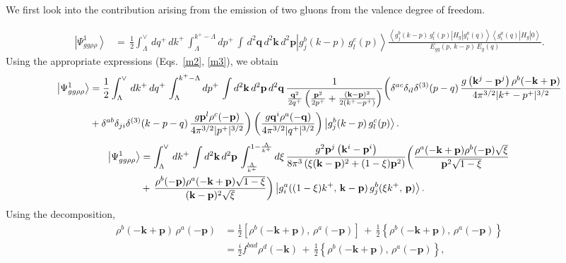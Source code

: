 \documentclass[aps,prd,amsmath,amssymb,nofootinbib]{revtex4-2}
\numberwithin{equation}{section}
\begin{document}
We first look into the contribution arising from the emission of two gluons from the valence degree of freedom.
\begin{figure}[h]
\end{figure}
\begin{align}
\left|\Psi_{gg\rho\rho}^{1}\right\rangle &=\,\frac{1}{2}\int_{\Lambda}^{\vee}\,dq^{+}\, dk^{+}\,\int_{\Lambda}^{k^{+}-\Lambda}dp^{+}\,\int\, d^{2}\mathbf{q}\, d^{2}\mathbf{k}\, d^{2}\mathbf{p}\left|g_{j}^{b}(k-p)\, g_{l}^{c}(p)\right\rangle \frac{\left\langle g_{j}^{b}(k-p)\, g_{l}^{c}(p)\left|H_{g}\right|g_{i}^{a}(q)\right\rangle \left\langle g_{i}^{a}(q)\left|H_{g}\right|0\right\rangle }{E_{gg}(p,\, k-p)\, E_{g}(q)}.
\end{align}
Using the appropriate expressions (Eqs.~\eqref{m2}, \eqref{m3}), we obtain
\begin{align}\label{ggrhorho1}
\left|\Psi_{gg\rho\rho}^{1}\right\rangle & = \frac{1}{2}\int_{\Lambda}^{\vee}\,dk^{+}\, dq^{+}\,\int_{\Lambda}^{k^{+}-\Lambda}dp^{+}\,\int d^{2}\mathbf{k}\, d^{2}\mathbf{p}\, d^{2}\mathbf{q}\,\frac{1}{\frac{\mathbf{q}^{2}}{2q^{+}}\left(\frac{\mathbf{p}^{2}}{2p^{+}}+\frac{(\mathbf{k}-\mathbf{p})^{2}}{2(k^{+}-p^{+})}\right)} \bigg(\delta^{ac}\delta_{il}\delta^{(3)}(p-q)\,\frac{g\left(\mathbf{k}^{j}-\mathbf{p}^{j}\right)\rho^{b}(-\mathbf{k} +\mathbf{p})}{4\pi^{3/2}|k^{+}-p^{+}|^{3/2}}\notag \\ & +\delta^{ab}\delta_{ji}\delta^{(3)}(k-p-q)\,\frac{g\mathbf{p}^{l}\rho^{c}(-\mathbf{p})}{4\pi^{3/2}|p^{+}|^{3/2}}\bigg) \left(\frac{g\mathbf{q}^{i}\rho^{a}(-\mathbf{q})}{4\pi^{3/2}|q^{+}|^{3/2}}\right)\left|g_{j}^{b}(k-p)\, g_{l}^{c}(p)\right\rangle. 
\end{align} 
\begin{align}
\left|\Psi_{gg\rho\rho}^{1}\right\rangle &=\int_{\Lambda}^{\vee}\,dk^{+}\,\int d^{2}\mathbf{k}\, d^{2}\mathbf{p}\,\int_{\frac{\Lambda}{k^{+}}}^{1-\frac{\Lambda}{k^{+}}}d\xi\,\frac{g^{2}\mathbf{p}^{j}\left(\mathbf{k}^{i}-\mathbf{p}^{i}\right)}{8\pi^{3}\left(\xi(\mathbf{k}-\mathbf{p})^{2}+(1-\xi)\mathbf{p}^{2}\right)}\bigg(\frac{\rho^{a}(-\mathbf{k}+\mathbf{p})\rho^{b}(-\mathbf{p})\sqrt{\xi}}{\mathbf{p}^{2}\sqrt{1-\xi}}\,\notag \\ & +\,\frac{\rho^{b}(-\mathbf{p})\rho^{a}(-\mathbf{k}+\mathbf{p})\sqrt{1-\xi}}{(\mathbf{k}-\mathbf{p})^{2}\sqrt{\xi}}\bigg)\left|g_{i}^{a}((1-\xi)k^{+},\,\mathbf{k}-\mathbf{p})\,g_{j}^{b}(\xi k^{+},\,\mathbf{p})\right\rangle.
\end{align}
Using the decomposition,
\begin{align}\label{decomposition}
\rho^{b}(-\mathbf{k}+\mathbf{p})\,\rho^{a}(-\mathbf{p}) &= \frac{1}{2}\left[\rho^{b}(-\mathbf{k}+\mathbf{p}),\,\rho^{a}(-\mathbf{p})\right]\,+\,\frac{1}{2}\left\{ \rho^{b}(-\mathbf{k}+\mathbf{p}),\,\rho^{a}(-\mathbf{p})\right\} \\
&= \frac{i}{2}f^{bad}\rho^{d}(-\mathbf{k})\,+\,\frac{1}{2}\left\{ \rho^{b}(-\mathbf{k}+\mathbf{p}),\,\rho^{a}(-\mathbf{p})\right\}, 
\end{align}
\end{document}
